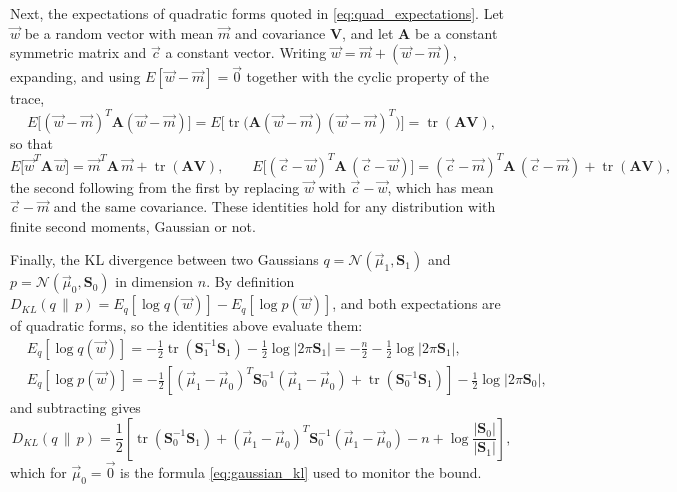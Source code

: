 \documentclass{article}
\begin{document}
Next, the expectations of quadratic forms quoted in \eqref{eq:quad_expectations}. Let $\vec w$ be a random vector with mean $\vec m$ and covariance $\mathbf V$, and let $\mathbf A$ be a constant symmetric matrix and $\vec c$ a constant vector. Writing $\vec w = \vec m + (\vec w - \vec m)$, expanding, and using $E[\vec w - \vec m] = \vec 0$ together with the cyclic property of the trace,
\begin{equation}
    E\big[(\vec w-\vec m)^T\mathbf A(\vec w-\vec m)\big] = E\big[\operatorname{tr}\big(\mathbf A(\vec w-\vec m)(\vec w-\vec m)^T\big)\big] = \operatorname{tr}(\mathbf A\mathbf V),
\end{equation}
so that
\begin{equation}
    E\big[\vec w^T \mathbf A\, \vec w\big] = \vec m^T\mathbf A\,\vec m + \operatorname{tr}(\mathbf A \mathbf V), \qquad
    E\big[(\vec c - \vec w)^T \mathbf A\, (\vec c - \vec w)\big] = (\vec c - \vec m)^T\mathbf A\,(\vec c - \vec m) + \operatorname{tr}(\mathbf A \mathbf V),
\end{equation}
the second following from the first by replacing $\vec w$ with $\vec c - \vec w$, which has mean $\vec c - \vec m$ and the same covariance. These identities hold for any distribution with finite second moments, Gaussian or not.

Finally, the KL divergence between two Gaussians $q = \mathcal N(\vec\mu_1, \mathbf S_1)$ and $p = \mathcal N(\vec\mu_0, \mathbf S_0)$ in dimension $n$. By definition $D_{KL}(q\,\|\,p) = E_q[\log q(\vec w)] - E_q[\log p(\vec w)]$, and both expectations are of quadratic forms, so the identities above evaluate them:
\begin{align}
    &E_q[\log q(\vec w)] = -\frac{1}{2}\operatorname{tr}(\mathbf S_1^{-1}\mathbf S_1) - \frac{1}{2}\log|2\pi \mathbf S_1| = -\frac{n}{2} - \frac{1}{2}\log|2\pi \mathbf S_1|,\\
    &E_q[\log p(\vec w)] = -\frac{1}{2}\left[(\vec\mu_1-\vec\mu_0)^T\mathbf S_0^{-1}(\vec\mu_1-\vec\mu_0) + \operatorname{tr}(\mathbf S_0^{-1}\mathbf S_1)\right] - \frac{1}{2}\log|2\pi \mathbf S_0|,
\end{align}
and subtracting gives
\begin{equation}
    D_{KL}(q\,\|\,p) = \frac12\left[\operatorname{tr}(\mathbf S_0^{-1}\mathbf S_1) + (\vec\mu_1-\vec\mu_0)^T\mathbf S_0^{-1}(\vec\mu_1-\vec\mu_0) - n + \log\frac{|\mathbf S_0|}{|\mathbf S_1|}\right],
\end{equation}
which for $\vec\mu_0 = \vec 0$ is the formula \eqref{eq:gaussian_kl} used to monitor the bound.
\end{document}
